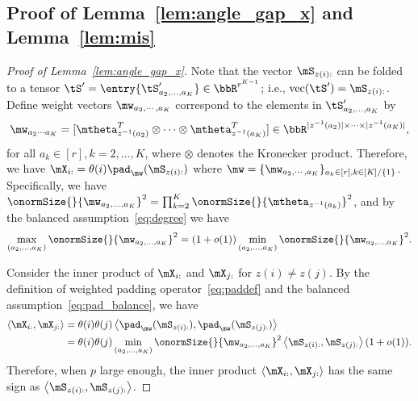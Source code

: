 \documentclass[lettersize,onecolumn,journal]{IEEEtran}
\theoremstyle{definition}
\theoremstyle{definition}
\newcommand{\ang}[1]{\left\langle#1\right\rangle}
\begin{document}
{
\color{blue}

\subsection{Proof of Lemma~\ref{lem:angle_gap_x} and Lemma~\ref{lem:mis}}

\begin{proof}[Proof of Lemma~\ref{lem:angle_gap_x}] 

Note that the vector $\mS_{z(i):}$ can be folded to a tensor $\tS' =\entry{\tS'_{a_2,\ldots,a_K}} \in \bbR^{r^{K-1}}$; i.e., $\text{vec}(\tS') = \mS_{z(i):}$. Define weight vectors $\mw_{a_2, \cdots, a_K}$ correspond to the elements in $\tS'_{a_2,\ldots,a_K}$ by
\begin{equation}
    \mw_{a_2 \cdots a_K} = [ \mtheta_{z^{-1} (a_2)}^T \otimes \cdots \otimes \mtheta_{z^{-1} (a_K)}^T] \in \bbR^{|z^{-1} (a_2)| \times \cdots \times |z^{-1} (a_K)|},
\end{equation}
for all $a_k \in [r], k = 2,\ldots, K$, where $\otimes$ denotes the Kronecker product. Therefore, we have  $\mX_{i:} = \theta(i) \pad_{\mw}(\mS_{z(i):})$ where $\mw = \{ \mw_{a_2, \cdots, a_K}\}_{a_k \in [r], k\in [K]/\{1\}}$. Specifically, we have $\onormSize{}{\mw_{a_2, \ldots, a_K}}^2 = \prod_{k = 2}^K \onormSize{}{ \mtheta_{z^{-1}(a_k)}}^2$, and by the balanced assumption~\eqref{eq:degree} we have 
\begin{equation}\label{eq:pad_balance}
    \max_{(a_2,\ldots, a_K)} \onormSize{}{\mw_{a_2,\ldots, a_K}}^2 = (1 + o(1))  \min_{(a_2,\ldots, a_K)} \onormSize{}{\mw_{a_2,\ldots, a_K}}^2.
\end{equation}

Consider the inner product of $\mX_{i:}$ and $\mX_{j:}$ for $z(i) \neq z(j)$. By the definition of weighted padding operator~\eqref{eq:paddef} and the balanced assumption~\eqref{eq:pad_balance}, we have 
\begin{align}
    \ang{\mX_{i:},\mX_{j:}} &= \theta(i) \theta(j) \ang{ \pad_{\mw}(\mS_{z(i):}), \pad_{\mw}(\mS_{z(j):} )}\\
    &= \theta(i) \theta(j) \min_{(a_2,\ldots, a_K)} \onormSize{}{\mw_{a_2,\ldots, a_K}}^2 \ang{\mS_{z(i):}, \mS_{z(j):}}(1 + o(1)).
\end{align}
Therefore, when $p$ large enough, the inner product $\ang{\mX_{i:},\mX_{j:}} $ has the same sign as $\ang{\mS_{z(i):}, \mS_{z(j):}}$. 

{
\color{blue} 

}
\end{proof}}
\end{document}
